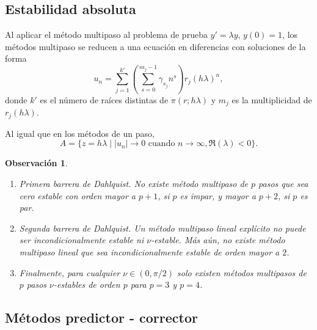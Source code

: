 \documentclass[11pt,letterpaper]{article}
\newtheorem{remark}{Observación}
\begin{document}
\subsection{Estabilidad absoluta}
Al aplicar el método multipaso al problema de prueba $y'=\lambda y$,
$y(0)=1$, los métodos multipaso se reducen a una ecuación en
diferencias con soluciones de la forma
\begin{equation}
  u_n = \sum_{j=1}^{k'}
  \left(
    \sum_{s=0}^{m_j-1} \gamma_{s_j} n^{s}
  \right)
  r_{j}(h\lambda)^n
,\end{equation}
donde $k'$ es el número de raíces distintas de $\pi(r;h\lambda)$ y
$m_j$ es la multiplicidad de $r_j(h\lambda)$.

Al igual que en los métodos de un paso,
\begin{equation}
  A 
  = \{
    z=h\lambda
  \mid
  |u_n|\to 0 \text{ cuando } n\to \infty,
  \Re(\lambda)<0
\}
.\end{equation}

\begin{remark}
  \begin{enumerate}
    \item
      Primera barrera de Dahlquist.
      No existe método multipaso de $p$ pasos que sea cero estable con
      orden mayor a $p+1$, si $p$ es impar, y mayor a $p+2$, si $p$ es
      par.
    \item
      Segunda barrera de Dahlquist. Un método multipaso lineal
      explícito no puede ser incondicionalmente estable ni
      $\nu$-estable. Más aún, no existe método multipaso lineal que
      sea incondicionalmente estable de orden mayor a $2$.
    \item
      Finalmente, para cualquier $\nu\in(0,\pi / 2)$ solo existen
      métodos multipasos de $p$ pasos $\nu$-estables de orden $p$ para
      $p=3$ y $p=4$.
  \end{enumerate}
\end{remark}

\subsection{Métodos predictor - corrector}
\end{document}
